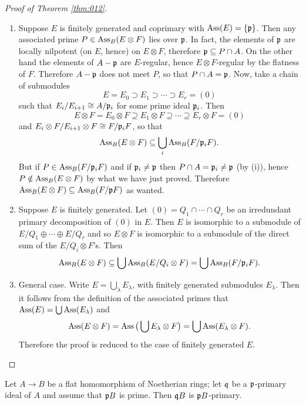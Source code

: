 \documentclass[../main]{subfiles}
\begin{document}
\begin{proof}[Proof of Theorem \ref{thm:012}]
\begin{enumerate}[label= (\roman*)]
\end{enumerate}
\begin{enumerate}[label = Step \arabic*.]
    \item Suppose $E$ is finitely generated and coprimary with $\operatorname{Ass}(E) = \{\mathfrak{p}\}$. Then any associated prime $P \in \operatorname{Ass}_B(E\otimes F)$ lies over $\mathfrak{p}$. In fact, the elements of $\mathfrak{p}$ are locally nilpotent (on $E$, hence) on $E\otimes F$, therefore $\mathfrak{p}\subseteq P\cap A$. On the other hand the elements of $A-\mathfrak{p}$ are $E$-regular, hence $E\otimes F$-regular by the flatness of $F$. Therefore $A-\mathfrak{p}$ does not meet $P$, so that $P\cap A=\mathfrak{p}$. Now, take a chain of submodules \[E= E_0\supset E_1\supset\cdots\supset E_r=(0)\]
    such that $E_i/E_{i+1}\cong A/\mathfrak{p}_i$ for some prime ideal $\mathfrak{p}_i$. Then \[E\otimes F = E_0\otimes F\supseteq E_1\otimes F\supseteq\cdots\supseteq E_r\otimes F=(0)\] and $E_i\otimes F/E_{i+1}\otimes F\cong F/\mathfrak{p}_iF$, so that \[\operatorname{Ass}_B(E\otimes F)\subseteq\bigcup_i\operatorname{Ass}_B(F/\mathfrak{p}_iF).\] But if $P\in\operatorname{Ass}_B(F/\mathfrak{p}_iF)$ and if $\mathfrak{p}_i\neq\mathfrak{p}$ then $P\cap A =\mathfrak{p}_i \neq\mathfrak{p}$ (by (i)), hence $P \notin \operatorname{Ass}_B(E\otimes F)$ by what we have just proved. Therefore \newline $\operatorname{Ass}_B(E\otimes F) \subseteq \operatorname{Ass}_B(F/\mathfrak{p}F)$ as wanted.
    \item Suppose $E$ is finitely generated. Let $(0) = Q_1\cap\cdots\cap Q_r$ be an irredundant primary decomposition of $(0)$ in $E$. Then $E$ is isomorphic to a submodule of $E/Q_1\oplus\cdots\oplus E/Q_r$ and so $E\otimes F$ is isomorphic to a submodule of the direct sum of
the $E/Q_i\otimes F$'s. Then \[\operatorname{Ass}_B(E\otimes F)\subseteq\bigcup\operatorname{Ass}_B(E/Q_i\otimes F)=\bigcup\operatorname{Ass}_B(F/\mathfrak{p}_iF).\]
    \item General case. Write $E = \bigcup_\lambda E_\lambda$, with finitely generated submodules $E_\lambda$. Then it follows from the definition of the associated primes that \newline $\operatorname{Ass}(E) = \bigcup \operatorname{Ass}(E_\lambda)$ and \[\operatorname{Ass}(E\otimes F) = \operatorname{Ass}\big(\bigcup E_\lambda\otimes F\big) = \bigcup \operatorname{Ass}(E_\lambda\otimes F).\] Therefore the proof is reduced to the case of finitely generated $E$.
\end{enumerate}

\end{proof}

\begin{partheorem}\label{thm:013}
Let $A \longrightarrow B$ be a flat homomorphism of Noetherian rings; let $\mathfrak{q}$ be a $\mathfrak{p}$-primary ideal of $A$ and assume that $\mathfrak{p}B$ is prime. Then $\mathfrak{q}B$ is $\mathfrak{p}B$-primary.
\end{partheorem}
\end{document}
